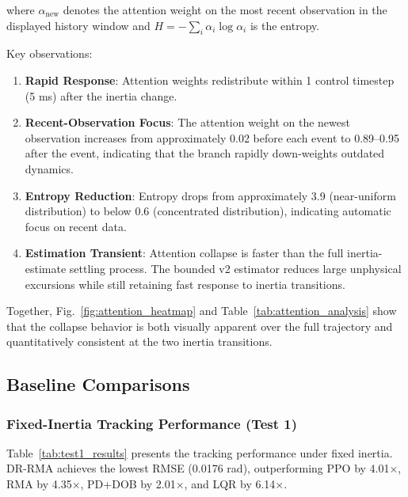 \documentclass[lettersize,journal]{IEEEtran}
\begin{document}
\noindent where $\alpha_{\mathrm{new}}$ denotes the attention weight on the most recent observation in the displayed history window and $H = -\sum_i \alpha_i \log \alpha_i$ is the entropy.

Key observations:
\begin{enumerate}
\item \textbf{Rapid Response}: Attention weights redistribute within 1 control timestep (5 ms) after the inertia change.

\item \textbf{Recent-Observation Focus}: The attention weight on the newest observation increases from approximately 0.02 before each event to 0.89--0.95 after the event, indicating that the branch rapidly down-weights outdated dynamics.

\item \textbf{Entropy Reduction}: Entropy drops from approximately 3.9 (near-uniform distribution) to below 0.6 (concentrated distribution), indicating automatic focus on recent data.

\item \textbf{Estimation Transient}: Attention collapse is faster than the full inertia-estimate settling process. The bounded v2 estimator reduces large unphysical excursions while still retaining fast response to inertia transitions.
\end{enumerate}

Together, Fig.~\ref{fig:attention_heatmap} and Table~\ref{tab:attention_analysis} show that the collapse behavior is both visually apparent over the full trajectory and quantitatively consistent at the two inertia transitions.


\subsection{Baseline Comparisons}

\subsubsection{Fixed-Inertia Tracking Performance (Test 1)}

Table~\ref{tab:test1_results} presents the tracking performance under fixed inertia. DR-RMA achieves the lowest RMSE (0.0176 rad), outperforming PPO by 4.01×, RMA by 4.35×, PD+DOB by 2.01×, and LQR by 6.14×.
\end{document}
